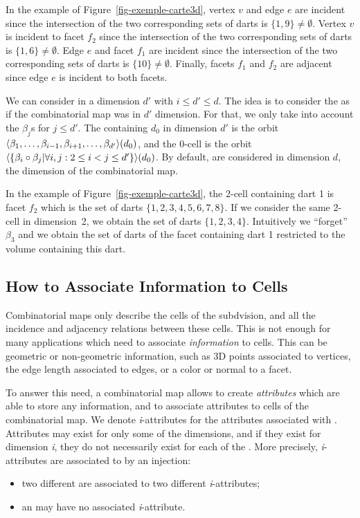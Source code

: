 In the example of Figure~\ref{fig-exemple-carte3d}, vertex $v$ and
edge $e$ are incident since the intersection of the two corresponding
sets of darts is $\{1,9\}\neq \emptyset$. Vertex $v$ is incident to facet
$f_2$ since the intersection of the two corresponding sets of darts is
$\{1,6\}\neq \emptyset$. Edge $e$ and facet $f_1$ are incident
since the intersection of the two corresponding sets of darts is
$\{10\}\neq \emptyset$. Finally, facets $f_1$ and $f_2$ are adjacent
since edge $e$ is incident to both facets.

We can consider  in a dimension $d'$ with $i \leq d' \leq
d$. The idea is to consider the  as if the combinatorial map
was in $d'$ dimension. For that, we only take into account the
$\beta_j$s for $j \leq d'$.  The  containing $d_0$ in dimension
$d'$ is the orbit
$\langle{}\beta_1,\ldots,\beta_{i-1},\beta_{i+1},\ldots,\beta_{d'}\rangle{}(d_0)$, and
the 0-cell is the orbit $\langle{}\{\beta_{i}\circ\beta_{j}|\forall i,j: 2\leq
  i<j \leq d'\}\rangle{}(d_0)$.  By default,  are considered in
dimension $d$, the dimension of the combinatorial map.

In the example of Figure~\ref{fig-exemple-carte3d}, the 2-cell
containing dart 1 is facet $f_2$ which is the set of darts
$\{1,2,3,4,5,6,7,8\}$. If we consider the same 2-cell in dimension~2,
we obtain the set of darts $\{1,2,3,4\}$. Intuitively we ``forget''
$\beta_3$ and we obtain the set of darts of the facet containing dart
1 restricted to the volume containing this dart.

\subsection{How to Associate Information to Cells}
\label{ssec-associate-attributes}
Combinatorial maps only describe the cells of the subdvision, and all
the incidence and adjacency relations between these cells. This is not
enough for many applications which need to associate
\emph{information} to cells.  This can be geometric or non-geometric
information, such as 3D points associated to vertices, the edge length
associated to edges, or a color or normal to a facet.

To answer this need, a combinatorial map allows to create
\emph{attributes} which are able to store any information, and to
associate attributes to cells of the combinatorial map.  We denote
\emph{i}-attributes for the attributes associated with
. Attributes may exist for only some of the dimensions, and
if they exist for dimension \emph{i}, they do not necessarily exist for
each of the .  More precisely, \emph{i}-attributes are associated
to  by an injection:
\begin{itemize}
\item two different  are associated to two different
  \emph{i}-attributes;
\item an  may have no associated \emph{i}-attribute.
\end{itemize}

